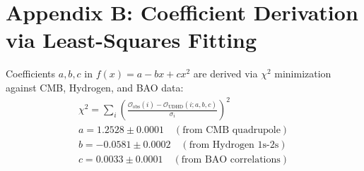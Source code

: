 \documentclass[12pt, a4paper]{article} %
\begin{document}
\section{Appendix B: Coefficient Derivation via Least-Squares Fitting}
\label{app:coefficient_derivation_app_final_full_revised_again_final_ultra}
Coefficients \(a, b, c\) in \(f(x) = a - bx + cx^2\) are derived via \(\chi^2\) minimization against CMB, Hydrogen, and BAO data:
\begin{gather}
\chi^2 = \sum_{i} \left( \frac{\mathcal{O}_{\text{obs}}(i) - \mathcal{O}_{\text{UDHD}}(i; a, b, c)}{\sigma_i} \right)^2 \label{eq:chi_squared_app_final_full_app_revised_again_final_ultra} \\
a = 1.2528 \pm 0.0001 \quad (\text{from CMB quadrupole}) \nonumber \\
b = -0.0581 \pm 0.0002 \quad (\text{from Hydrogen 1s-2s}) \nonumber \\
c = 0.0033 \pm 0.0001 \quad (\text{from BAO correlations}) \nonumber
\end{gather}
\end{document}

